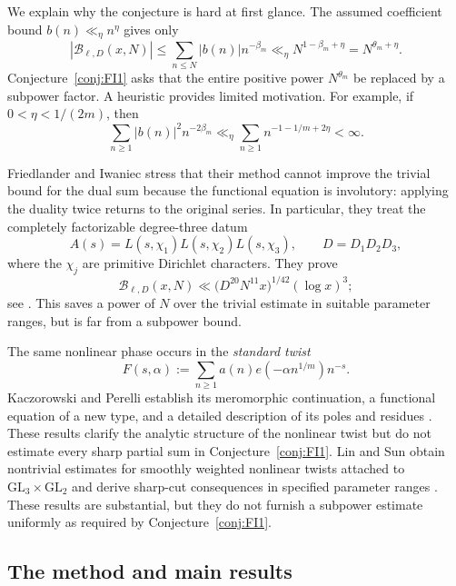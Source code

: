 \documentclass[11pt]{amsart}
\theoremstyle{plain}
\theoremstyle{definition}
\theoremstyle{remark}
\newcommand{\Bcal}{\mathcal B}
\numberwithin{equation}{section}
\begin{document}
We explain why the conjecture is hard at first glance. The assumed coefficient bound $b(n)\ll_\eta n^\eta$ gives only
\begin{equation}\label{eq:FI-trivial-bound}
  |\Bcal_{\ell,D}(x,N)|
  \le\sum_{n\le N}|b(n)|n^{-\beta_m}
  \ll_\eta N^{1-\beta_m+\eta}
  =N^{\theta_m+\eta}.
\end{equation}
Conjecture~\ref{conj:FI1} asks that the entire positive power
$N^{\theta_m}$ be replaced by a subpower factor.  A heuristic provides limited motivation. For example, if
$0<\eta<1/(2m)$, then
\[
  \sum_{n\ge1}|b(n)|^2n^{-2\beta_m}
  \ll_\eta\sum_{n\ge1}n^{-1-1/m+2\eta}<\infty.
\]


Friedlander and Iwaniec stress that their method cannot improve the trivial
bound for the dual sum because the functional equation is involutory: applying the duality twice returns to the original series. In particular, they treat the completely factorizable degree-three datum
\[
  A(s)=L(s,\chi_1)L(s,\chi_2)L(s,\chi_3),
  \qquad D=D_1D_2D_3,
\]
where the $\chi_j$ are primitive Dirichlet characters. They prove
\begin{equation}\label{eq:FI-degree-three-B-progress}
  \Bcal_{\ell,D}(x,N)
  \ll
  \bigl(D^{20}N^{11}x\bigr)^{1/42}(\log x)^3;
\end{equation}
see \cite[(4.4)--(4.9)]{FriedlanderIwaniec}.  This saves a power of $N$ over
the trivial estimate in suitable parameter ranges, but is far from a
subpower bound.

The same nonlinear phase occurs in the \emph{standard twist}
\[
  F(s,\alpha)
  :=\sum_{n\ge1}a(n)e(-\alpha n^{1/m})n^{-s}.
\]
Kaczorowski and Perelli establish its meromorphic continuation, a functional
equation of a new type, and a detailed description of its poles and residues
\cite[(1.1), Theorems~2--3]{KaczorowskiPerelli}.  These results clarify the analytic structure of
the nonlinear twist but do not estimate every sharp partial sum in
Conjecture~\ref{conj:FI1}.  Lin and Sun obtain nontrivial estimates for smoothly weighted nonlinear
twists attached to $\mathrm{GL}_3\times\mathrm{GL}_2$ and derive sharp-cut
consequences in specified parameter ranges
\cite[Theorem~1.1 and Corollary~1.2]{LinSun}.  These results are
substantial, but they do not furnish a subpower estimate uniformly as required by Conjecture~\ref{conj:FI1}.

\subsection{The method and main results}
\end{document}
